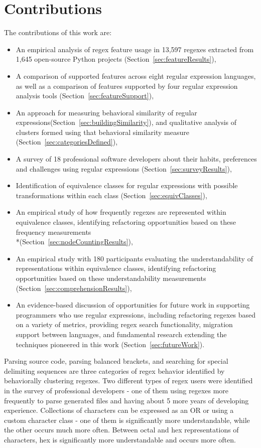 \section{Contributions}

The contributions of this work are:
\begin{itemize} \setlength \itemsep{.1pt}
    \item An empirical analysis of regex feature usage in 13,597 regexes extracted from 1,645 open-source Python projects (Section~\ref{sec:featureResults}),
    \item A comparison of supported features across eight regular expression languages, as well as a comparison of features supported by four regular expression analysis tools (Section~\ref{sec:featureSupport}),
    \item An approach for measuring behavioral similarity of regular expressions(Section~\ref{sec:buildingSimilarity}), and qualitative analysis of clusters formed using that behavioral similarity measure (Section~\ref{sec:categoriesDefined}),
    \item A survey of 18 professional software developers about their habits, preferences and challenges using regular expressions (Section~\ref{sec:surveyResults}),
    \item Identification of equivalence classes for regular expressions with possible transformations within each class (Section~\ref{sec:equivClasses}),
    \item An empirical study of how frequently regexes are represented within equivalence classes, identifying refactoring opportunities based on these frequency measurements
    \\*(Section~\ref{sec:nodeCountingResults}),
    \item An empirical study with 180 participants evaluating the understandability of representations within equivalence classes, identifying refactoring opportunities based on these understandability measurements (Section~\ref{sec:comprehensionResults}),
    \item An evidence-based discussion of opportunities for future work in supporting programmers who use regular expressions, including refactoring regexes based on a variety of metrics, providing regex search functionality, migration support between languages, and fundamental research extending the techniques pioneered in this work (Section~\ref{sec:futureWork}).
\end{itemize}

Parsing source code, parsing balanced brackets, and searching for special delimiting sequences are three categories of regex behavior identified by behaviorally clustering regexes.  Two different types of regex users were identified in the survey of professional developers - one of them using regexes more frequently to parse generated files and having about 5 more years of developing experience.  Collections of characters can be expressed as an OR or using a custom character class - one of them is significantly more understandable, while the other occurs much more often. Between octal and hex representations of characters, hex is significantly more understandable and occurs more often.
